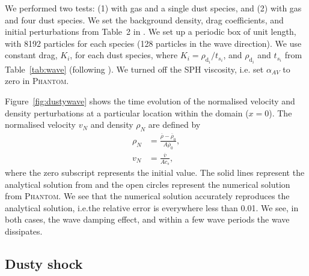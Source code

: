 \documentclass[fleqn,usenatbib]{mnras}
\newcommand{\dd}{\mathrm{d}}
\begin{document}
We performed two tests: (1) with gas and a single dust species, and (2) with gas
and four dust species. We set the background density, drag coefficients, and
initial perturbations from Table~2 in
\citet{Benitez-Llambay2019ApJS..241...25B}. We set up a periodic box of unit
length, with 8192 particles for each species (128 particles in the wave
direction). We use constant drag, \(K_i\), for each dust species, where \(K_i =
\rho_{\dd_i} / t_{s_i}\), and \(\rho_{\dd_i}\) and \(t_{s_i}\) from
Table~\ref{tab:wave} (following \citealt{Benitez-Llambay2019ApJS..241...25B}).
We turned off the SPH viscosity, i.e. set \(\alpha_{AV}\) to zero in
\textsc{Phantom}.

Figure~\ref{fig:dustywave} shows the time evolution of the normalised velocity
and density perturbations at a particular location within the domain (\(x=0\)).
The normalised velocity \( v_N \) and density \( \rho_N \) are defined by
%
\begin{align}
   \rho_N &= \frac{\overline{\rho} - \overline{\rho}_0}{A \overline{\rho}_0}, \\
   v_N &= \frac{\overline{v}}{A c_s},
\end{align}
%
where the zero subscript represents the initial value. The solid lines represent
the analytical solution from \citet{Benitez-Llambay2019ApJS..241...25B} and the
open circles represent the numerical solution from \textsc{Phantom}. We see that
the numerical solution accurately reproduces the analytical solution, i.e.\@ the
relative error is everywhere less than 0.01. We see, in both cases, the wave
damping effect, and within a few wave periods the wave dissipates.

\subsection{Dusty shock}%
\label{subsec:shock}
\end{document}
